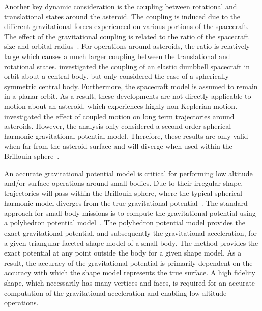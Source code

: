 Another key dynamic consideration is the coupling between rotational and translational states around the asteroid.
The coupling is induced due to the different gravitational forces experienced on various portions of the spacecraft. 
The effect of the gravitational coupling is related to the ratio of the spacecraft size and orbital radius~\cite{hughes2004}.
For operations around asteroids, the ratio is relatively large which causes a much larger coupling between the translational and rotational states.
\Textcite{elmasri2005,sanyal2004a} investigated the coupling of an elastic dumbbell spacecraft in orbit about a central body, but only considered the case of a spherically symmetric central body.
Furthermore, the spacecraft model is assumed to remain in a planar orbit.
As a result, these developments are not directly applicable to motion about an asteroid, which experiences highly non-Keplerian motion.
\Textcite{misra2015b} investigated the effect of coupled motion on long term trajectories around asteroids.
However, the analysis only considered a second order spherical harmonic gravitational potential model. 
Therefore, these results are only valid when far from the asteroid surface and will diverge when used within the Brillouin sphere~\cite{scheeres2012a}.

An accurate gravitational potential model is critical for performing low altitude and/or surface operations around small bodies.
Due to their irregular shape, trajectories will pass within the Brillouin sphere, where the typical spherical harmonic model diverges from the true gravitational potential~\cite{scheeres2012a}.
The standard approach for small body missions is to compute the gravitational potential using a polyhedron potential model~\cite{werner1996}.
The polyhedron potential model provides the exact gravitational potential, and subsequently the gravitational acceleration, for a given triangular faceted shape model of a small body.
The method provides the exact potential at any point outside the body for a given shape model.
As a result, the accuracy of the gravitational potential is primarily dependent on the accuracy with which the shape model represents the true surface.
A high fidelity shape, which necessarily has many vertices and faces, is required for an accurate computation of the gravitational acceleration and enabling low altitude operations.

